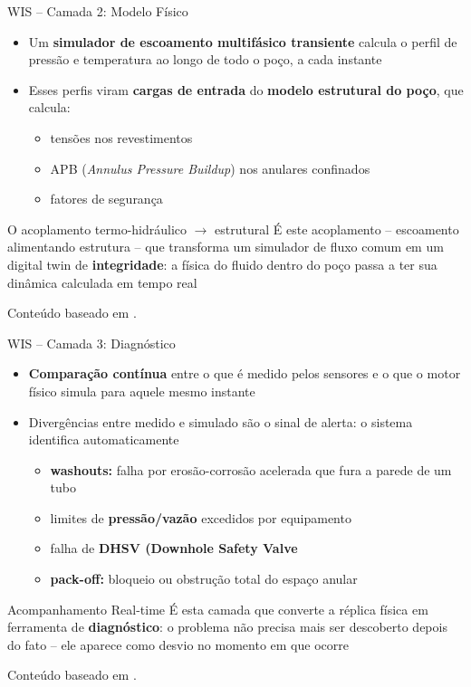 \documentclass[aspectratio=169,xcolor=dvipsnames]{beamer}
\begin{document}
\begin{frame}{WIS -- Camada 2: Modelo Físico}
    \begin{itemize}\setlength\itemsep{5pt}
        \item Um \textbf{simulador de escoamento multifásico transiente} calcula o perfil de pressão e temperatura ao longo de todo o poço, a cada instante
        \item Esses perfis viram \textbf{cargas de entrada} do \textbf{modelo estrutural do poço}, que calcula:
        \begin{itemize}
            \item tensões nos revestimentos
            \item APB (\textit{Annulus Pressure Buildup}) nos anulares confinados
            \item fatores de segurança
        \end{itemize}
    \end{itemize}
    \begin{exampleblock}{O acoplamento termo-hidráulico $\rightarrow$ estrutural}
        É este acoplamento -- escoamento alimentando estrutura -- que transforma um simulador de fluxo comum em um digital twin de \textbf{integridade}: a física do fluido dentro do poço passa a ter sua dinâmica calculada em tempo real
    \end{exampleblock}
    \vfill
    \footnotesize Conteúdo baseado em \cite{otc2020}.
\end{frame}

\begin{frame}{WIS -- Camada 3: Diagnóstico}
    \begin{itemize}\setlength\itemsep{6pt}
        \item \textbf{Comparação contínua} entre o que é medido pelos sensores e o que o motor físico simula para aquele mesmo instante
        \item Divergências entre medido e simulado são o sinal de alerta: o sistema identifica automaticamente
        \begin{itemize}
            \item \textbf{washouts:} falha por erosão-corrosão acelerada que fura a parede de um tubo
            \item limites de \textbf{pressão/vazão} excedidos por equipamento
            \item falha de \textbf{DHSV (Downhole Safety Valve}
            \item \textbf{pack-off:} bloqueio ou obstrução total do espaço anular 
        \end{itemize}
    \end{itemize}
    \begin{exampleblock}{Acompanhamento Real-time}
        É esta camada que converte a réplica física em ferramenta de \textbf{diagnóstico}: o problema não precisa mais ser descoberto depois do fato -- ele aparece como desvio no momento em que ocorre
    \end{exampleblock}
    \vfill
    \footnotesize Conteúdo baseado em \cite{otc2020}.
\end{frame}
\end{document}
